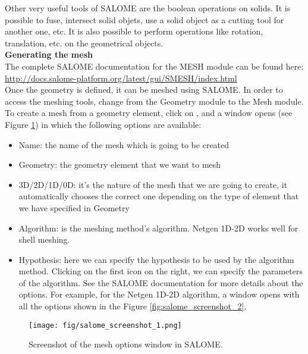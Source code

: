 Other very useful tools of SALOME are the boolean operations on solids.
It is possible to fuse, intersect solid objets, use a solid object as a 
cutting tool for another one, etc.
It is also possible to perform operations like rotation, translation, etc. on
the geometrical objects.\\

\textbf{Generating the mesh}\\

The complete SALOME documentation for the MESH module can be found here:\\
\url{http://docs.salome-platform.org/latest/gui/SMESH/index.html}\\

Once the geometry is defined, it can be meshed using SALOME.
In order to access the meshing tools, change from the Geometry 
module to the Mesh module.
To create a mesh from a geometry element, click on , 
and a window opens (see Figure \ref{fig:salome_screenshot_1}) in which the following options are available:
\begin{itemize}
\item Name: the name of the mesh which is going to be created
\item Geometry: the geometry element that we want to mesh
\item 3D/2D/1D/0D: it’s the nature of the mesh that we are 
going to create, it automatically chooses the correct one 
depending on the type of element that we have specified in Geometry
\item Algorithm: is the meshing method’s algorithm. 
Netgen 1D-2D works well for shell meshing.
\item Hypothesis: here we can specify the hypothesis to be used 
by the algorithm method. Clicking on the first icon on the right, 
we can specify the parameters of the algorithm. See the SALOME 
documentation for more details about the options. 
For example, for the Netgen 1D-2D algorithm, a window opens 
with all the options shown in the Figure \ref{fig:salome_screenshot_2}.
\end{itemize}

\begin{figure}[h]
  \begin{center}
    \texttt{[image: fig/salome\_screenshot\_1.png]}
    \caption{Screenshot of the mesh options window in SALOME.}\label{fig:salome_screenshot_1}   
  \end{center}
\end{figure}

